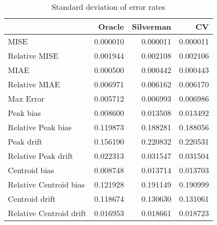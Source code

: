 \begin{table}[H]
\centering
\begin{tabular}{lrrr}
  \hline
 & Oracle & Silverman & CV \\ 
  \hline
MISE & 0.000010 & 0.000011 & 0.000011 \\ 
  Relative MISE & 0.001944 & 0.002108 & 0.002106 \\ 
  MIAE & 0.000500 & 0.000442 & 0.000443 \\ 
  Relative MIAE & 0.006971 & 0.006162 & 0.006170 \\ 
  Max Error & 0.005712 & 0.006993 & 0.006986 \\ 
  Peak bias & 0.008600 & 0.013508 & 0.013492 \\ 
  Relative Peak bias & 0.119873 & 0.188281 & 0.188056 \\ 
  Peak drift & 0.156190 & 0.220832 & 0.220531 \\ 
  Relative Peak drift & 0.022313 & 0.031547 & 0.031504 \\ 
  Centroid bias & 0.008748 & 0.013714 & 0.013703 \\ 
  Relative Centroid bias & 0.121928 & 0.191149 & 0.190999 \\ 
  Centroid drift & 0.118674 & 0.130630 & 0.131061 \\ 
  Relative Centroid drift & 0.016953 & 0.018661 & 0.018723 \\ 
   \hline
\end{tabular}
\caption{Standard deviation of error rates} 
\label{tbl:stddev_error_rates}
\end{table}
